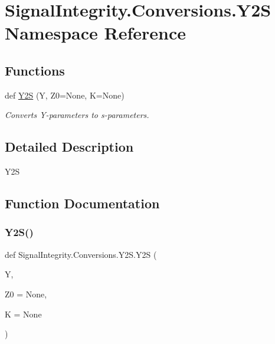 \hypertarget{namespaceSignalIntegrity_1_1Conversions_1_1Y2S}{}\section{Signal\+Integrity.\+Conversions.\+Y2S Namespace Reference}
\label{namespaceSignalIntegrity_1_1Conversions_1_1Y2S}
\subsection*{Functions}
\begin{DoxyCompactItemize}
\item 
def \hyperlink{namespaceSignalIntegrity_1_1Conversions_1_1Y2S_ad5d295028fc49f2114fcad9581207b07}{Y2S} (Y, Z0=None, K=None)
\begin{DoxyCompactList}\small\item\em Converts Y-\/parameters to s-\/parameters. \end{DoxyCompactList}\end{DoxyCompactItemize}


\subsection{Detailed Description}
\begin{DoxyVerb}Y2S\end{DoxyVerb}
 

\subsection{Function Documentation}
\mbox{\label{namespaceSignalIntegrity_1_1Conversions_1_1Y2S_ad5d295028fc49f2114fcad9581207b07}} 
\subsubsection{\texorpdfstring{Y2\+S()}{Y2S()}}
{\footnotesize\ttfamily def Signal\+Integrity.\+Conversions.\+Y2\+S.\+Y2S (\begin{DoxyParamCaption}\item[{}]{Y,  }\item[{}]{Z0 = {\ttfamily None},  }\item[{}]{K = {\ttfamily None} }\end{DoxyParamCaption})}



